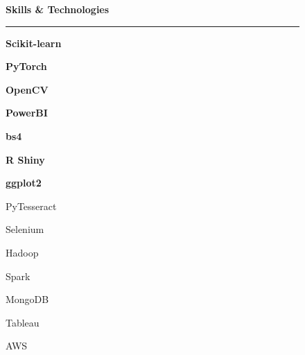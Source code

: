\documentclass[a4paper, 10pt]{article}
\newcommand{\lhsWidth}{0.3\textwidth}
\newenvironment{mainSkillBox}[2]{%
  \colorbox{mainSkillBoxCol}{%
    \parbox{#2}{%
	\centering
      \textbf{\textcolor{mainSkillTextCol} {#1}}
    }
  }
}{}
\newenvironment{subSkillBox}[2]{%
  \colorbox{subSkillBoxCol}{%
    \parbox{#2}{%
	\centering
      {\textcolor{subSkillTextCol} {#1}}
    }
  }
}{}
\begin{document}
\begin{figure}[h]
\begin{minipage}[t][\paperheight][t]{\lhsWidth}
	{\large \textbf{Skills \& Technologies}} \newline
	\rule [6pt]{\linewidth}{1pt}
	\vspace{-15pt}
	\newline \vspace{3pt}
	\begin{mainSkillBox}{Scikit-learn}{60pt}
	\end{mainSkillBox}
	\begin{mainSkillBox}{PyTorch}{40pt}
	\end{mainSkillBox}
	\newline \vspace{3pt}
	\begin{mainSkillBox}{OpenCV}{40pt}
	\end{mainSkillBox}
	\begin{mainSkillBox}{PowerBI}{40pt}
	\end{mainSkillBox}
	\begin{mainSkillBox}{bs4}{20pt}
	\end{mainSkillBox}
	\newline \vspace{3pt}
	\begin{mainSkillBox}{R Shiny}{45pt}
	\end{mainSkillBox}
	\begin{mainSkillBox}{ggplot2}{35pt}
	\end{mainSkillBox}
	\newline \vspace{3pt}
	\begin{subSkillBox}{PyTesseract}{50pt}
	\end{subSkillBox}
	\begin{subSkillBox}{Selenium}{40pt}
	\end{subSkillBox}
	\newline \vspace{3pt}
	\begin{subSkillBox}{Hadoop}{35pt}
	\end{subSkillBox}
	\begin{subSkillBox}{Spark}{25pt}
	\end{subSkillBox}
	\begin{subSkillBox}{MongoDB}{45pt}
	\end{subSkillBox}
	\newline \vspace{3pt}
	\begin{subSkillBox}{Tableau}{35pt}
	\end{subSkillBox}
	\begin{subSkillBox}{AWS}{20pt}
	\end{subSkillBox}


\end{minipage}
\end{figure}
\end{document}
